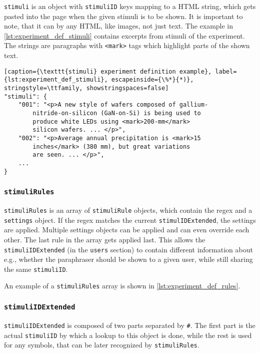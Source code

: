 \texttt{stimuli} is an object with \texttt{stimuliID} keys mapping to a HTML string, which gets pasted into the page when the given stimuli is to be shown. It is important to note, that it can by any HTML, like images, not just text. The example in \cref{lst:experiment_def_stimuli} contains excerpts from stimuli of the experiment. The strings are paragraphs with \texttt{<mark>} tags which highlight parts of the shown text.

\begin{lstlisting}[caption={\texttt{stimuli} experiment definition example}, label={lst:experiment_def_stimuli}, escapeinside={\%*}{*)}, stringstyle=\ttfamily, showstringspaces=false]
"stimuli": {
    "001": "<p>A new style of wafers composed of gallium-
        nitride-on-silicon (GaN-on-Si) is being used to
        produce white LEDs using <mark>200-mm</mark>
        silicon wafers. ... </p>",
    "002": "<p>Average annual precipitation is <mark>15
        inches</mark> (380 mm), but great variations
        are seen. ... </p>",
    ...
}
\end{lstlisting}

\subsubsection*{\texttt{stimuliRules}}

\texttt{stimuliRules} is an array of \texttt{stimuliRule} objects, which contain the regex and a \texttt{settings} object. If the regex matches the current \texttt{stimulIDExtended}, the settings are applied. Multiple settings objects can be applied and can even override each other. The last rule in the array gets applied last. This allows the \texttt{stimuliIDExtended} (in the \texttt{users} section) to contain different information about e.g., whether the paraphraser should be shown to a given user, while still sharing the same \texttt{stimuliID}.

An example of a \texttt{stimuliRules} array is shown in \cref{lst:experiment_def_rules}.

\subsubsection*{\texttt{stimuliIDExtended}}

\texttt{stimuliIDExtended} is composed of two parts separated by \texttt{\#}. The first part is the actual \texttt{stimuliID} by which a lookup to this object is done, while the rest is used for any symbols, that can be later recognized by \texttt{stimuliRules}.

